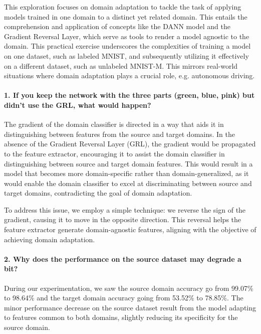 This exploration focuses on domain adaptation to tackle the task of applying models trained in one domain to a distinct yet related domain. This entails the comprehension and application of concepts like the DANN model and the Gradient Reversal Layer, which serve as tools to render a model agnostic to the domain. This practical exercise underscores the complexities of training a model on one dataset, such as labeled MNIST, and subsequently utilizing it effectively on a different dataset, such as unlabeled MNIST-M. This mirrors real-world situations where domain adaptation plays a crucial role, e.g. autonomous driving.

\paragraph*{1. If you keep the network with the three parts (green, blue, pink) but didn't use the GRL, what would happen?}

The gradient of the domain classifier is directed in a way that aids it in distinguishing between features from the source and target domains. In the absence of the Gradient Reversal Layer (GRL), the gradient would be propagated to the feature extractor, encouraging it to assist the domain classifier in distinguishing between source and target domain features. This would result in a model that becomes more domain-specific rather than domain-generalized, as it would enable the domain classifier to excel at discriminating between source and target domains, contradicting the goal of domain adaptation.

To address this issue, we employ a simple technique: we reverse the sign of the gradient, causing it to move in the opposite direction. This reversal helps the feature extractor generate domain-agnostic features, aligning with the objective of achieving domain adaptation.


\paragraph*{2. Why does the performance on the source dataset may degrade a bit?}

During our experimentation, we saw the source domain accuracy go from 99.07\% to 98.64\% and the target domain accuracy going from 53.52\% to 78.85\%. The minor performance decrease on the source dataset result from the model adapting to features common to both domains, slightly reducing its specificity for the source domain.

